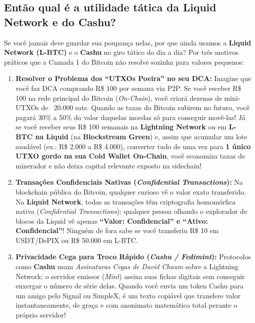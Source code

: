 \documentclass{pousadaguide}
\begin{document}
\subsection{Então qual é a utilidade tática da Liquid Network e do Cashu?}

Se você jamais deve guardar sua poupança nelas, por que ainda usamos a \textbf{Liquid Network (L-BTC)} e o \textbf{Cashu} no giro tático do dia a dia? Por três motivos práticos que a Camada 1 do Bitcoin não resolve sozinha para valores pequenos:

\begin{enumerate}
  \item \textbf{Resolver o Problema dos “UTXOs Poeira” no seu DCA:}
  Imagine que você faz DCA comprando R\$ 100 por semana via P2P. Se você receber R\$ 100 na rede principal do Bitcoin (\emph{On-Chain}), você criará dezenas de mini-UTXOs de ~20.000 sats. Quando as taxas do Bitcoin subirem no futuro, você pagará 30\% a 50\% do valor daquelas moedas só para conseguir movê-las! Já se você receber seus R\$ 100 semanais na \textbf{Lightning Network} ou em \textbf{L-BTC na Liquid} (na \textbf{Blockstream Green}) e, assim que acumular um lote saudável (ex.: R\$ 2.000 a R\$ 4.000), converter tudo de uma vez para \textbf{1 único UTXO gordo na sua Cold Wallet On-Chain}, você economiza taxas de minerador e não deixa capital relevante exposto na sidechain!
  \item \textbf{Transações Confidenciais Nativas (\emph{Confidential Transactions}):}
  Na blockchain pública do Bitcoin, qualquer curioso vê o valor exato transferido. Na \textbf{Liquid Network}, todas as transações têm criptografia homomórfica nativa (\emph{Confidential Transactions}): qualquer pessoa olhando o explorador de blocos da Liquid vê apenas \textbf{“Valor: Confidencial” e “Ativo: Confidencial”}! Ninguém de fora sabe se você transferiu R\$ 10 em USDT/DePIX ou R\$ 50.000 em L-BTC.
  \item \textbf{Privacidade Cega para Troco Rápido (\emph{Cashu / Fedimint}):}
  Protocolos como \textbf{Cashu} usam \emph{Assinaturas Cegas de David Chaum} sobre a Lightning Network: o servidor emissor (\emph{Mint}) assina suas fichas digitais sem conseguir enxergar o número de série delas. Quando você envia um token Cashu para um amigo pelo Signal ou SimpleX, é um texto copiável que transfere valor instantaneamente, de graça e com anonimato matemático total perante o próprio servidor!
\end{enumerate}
\end{document}
